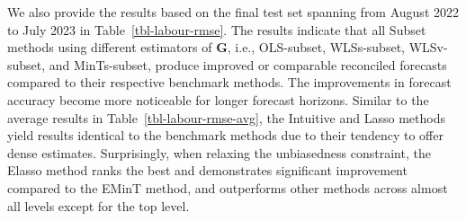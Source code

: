 \documentclass[11pt,a4paper,]{article}
\begin{document}
We also provide the results based on the final test set spanning from
August 2022 to July 2023 in Table~\ref{tbl-labour-rmse}. The results
indicate that all Subset methods using different estimators of
\(\boldsymbol{G}\), i.e., OLS-subset, WLSs-subset, WLSv-subset, and
MinTs-subset, produce improved or comparable reconciled forecasts
compared to their respective benchmark methods. The improvements in
forecast accuracy become more noticeable for longer forecast horizons.
Similar to the average results in Table~\ref{tbl-labour-rmse-avg}, the
Intuitive and Lasso methods yield results identical to the benchmark
methods due to their tendency to offer dense estimates. Surprisingly,
when relaxing the unbiasedness constraint, the Elasso method ranks the
best and demonstrates significant improvement compared to the EMinT
method, and outperforms other methods across almost all levels except
for the top level.
\end{document}
